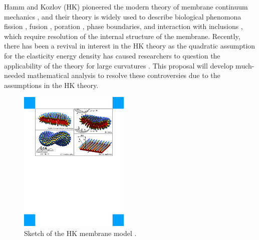 Hamm and Kozlov (HK) pioneered 
the modern theory of membrane continuum mechanics \cite{Hamm2000}, and their theory
is widely used to describe biological phenomona 
fission \cite{FrEsAkSh15, Maetal15, PhysRevE.79.031926},
fusion \cite{ChKo08, KoKo2002,Kuzmin7235,Aeffner2012},
poration \cite{Gaetal20}, phase boundaries, and interaction with inclusions
\cite{SeLeMaEg17,Saetal20, Pietal20}, which require resolution of the internal structure of the membrane.  
Recently, there has been a revival in interest in the HK theory as the quadratic assumption
for the elasticity energy density has caused
researchers to question the applicability of the theory 
for large curvatures
\cite{PhysRevLett.117.188102, ARGUDO20161619}.
This proposal will develop much-needed mathematical analysis to resolve
these controversies due to the assumptions in the HK theory. 
%
\begin{figure}
\centerline{\includegraphics[width=0.47\textwidth]{Figures/Deformations.pdf}}
  \vspace{-5pt}
\caption{\label{fig:deformations} \footnotesize Sketch of the HK
 membrane model \cite{Hamm2000}.}
\end{figure}
%


